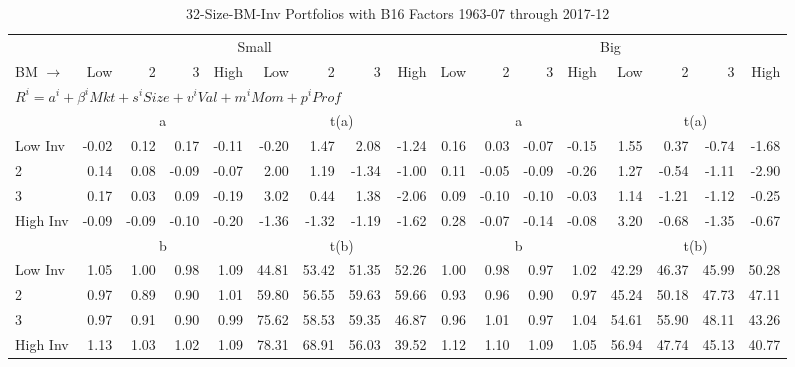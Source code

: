 
\begin{table}[!ht]
\footnotesize
\centering
\caption{32-Size-BM-Inv Portfolios with B16 Factors 1963-07 through 2017-12}
\begin{tabular}{lrrrrrrrrrrrrrrrr}
  \toprule
     & \multicolumn{8}{c}{Small} & \multicolumn{8}{c}{Big}  \\
     \cmidrule(r){2-9} \cmidrule(r){10-17}
    BM $\rightarrow$ & Low & 2 & 3 & High & Low & 2 & 3 & High & Low & 2 & 3 & High & Low & 2 & 3 & High  \\ 
  \midrule
  \multicolumn{17}{l}{$R^i=a^i+\beta^iMkt+s^iSize+v^iVal+m^iMom+p^iProf$}  \\
  
     & \multicolumn{4}{c}{a} & \multicolumn{4}{c}{t(a)}  & \multicolumn{4}{c}{a} & \multicolumn{4}{c}{t(a)}   \\
     \cmidrule(r){2-5} \cmidrule(r){6-9}  \cmidrule(r){10-13} \cmidrule(r){14-17} 
    Low Inv  & -0.02  & 0.12  & 0.17  & -0.11  & -0.20  & 1.47  & 2.08  & -1.24  & 0.16  & 0.03  & -0.07  & -0.15  & 1.55  & 0.37  & -0.74  & -1.68   \\
    2  & 0.14  & 0.08  & -0.09  & -0.07  & 2.00  & 1.19  & -1.34  & -1.00  & 0.11  & -0.05  & -0.09  & -0.26  & 1.27  & -0.54  & -1.11  & -2.90   \\
    3  & 0.17  & 0.03  & 0.09  & -0.19  & 3.02  & 0.44  & 1.38  & -2.06  & 0.09  & -0.10  & -0.10  & -0.03  & 1.14  & -1.21  & -1.12  & -0.25   \\
    High Inv  & -0.09  & -0.09  & -0.10  & -0.20  & -1.36  & -1.32  & -1.19  & -1.62  & 0.28  & -0.07  & -0.14  & -0.08  & 3.20  & -0.68  & -1.35  & -0.67   \\
    
  
     & \multicolumn{4}{c}{b} & \multicolumn{4}{c}{t(b)}  & \multicolumn{4}{c}{b} & \multicolumn{4}{c}{t(b)}   \\
     \cmidrule(r){2-5} \cmidrule(r){6-9}  \cmidrule(r){10-13} \cmidrule(r){14-17} 
    Low Inv  & 1.05  & 1.00  & 0.98  & 1.09  & 44.81  & 53.42  & 51.35  & 52.26  & 1.00  & 0.98  & 0.97  & 1.02  & 42.29  & 46.37  & 45.99  & 50.28   \\
    2  & 0.97  & 0.89  & 0.90  & 1.01  & 59.80  & 56.55  & 59.63  & 59.66  & 0.93  & 0.96  & 0.90  & 0.97  & 45.24  & 50.18  & 47.73  & 47.11   \\
    3  & 0.97  & 0.91  & 0.90  & 0.99  & 75.62  & 58.53  & 59.35  & 46.87  & 0.96  & 1.01  & 0.97  & 1.04  & 54.61  & 55.90  & 48.11  & 43.26   \\
    High Inv  & 1.13  & 1.03  & 1.02  & 1.09  & 78.31  & 68.91  & 56.03  & 39.52  & 1.12  & 1.10  & 1.09  & 1.05  & 56.94  & 47.74  & 45.13  & 40.77   \\
    

\end{tabular}
\end{table}
